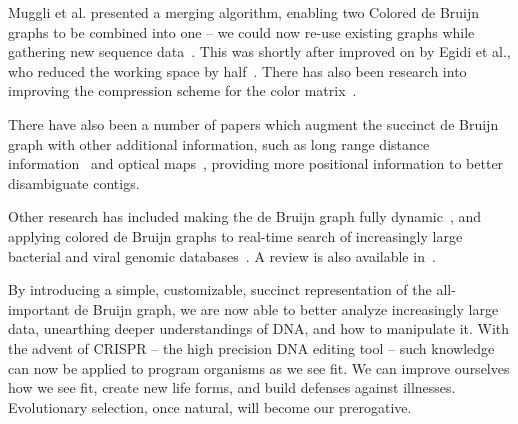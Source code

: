 Muggli et al. presented a merging algorithm, enabling two Colored de Bruijn graphs to be combined into one -- we could now re-use existing graphs while gathering new sequence data~\cite{Mug19}. This was shortly after improved on by Egidi et al., who reduced the working space by half~\cite{Egi19}. There has also been research into improving the compression scheme for the color matrix~\cite{Ali18,Mus18}.

There have also been a number of papers which augment the succinct de Bruijn graph with other additional information, such as long range distance information~\cite{Tur18} and optical maps~\cite{Muk18}, providing more positional information to better disambiguate contigs.

Other research has included making the de Bruijn graph fully dynamic~\cite{Cra18,Bel16}, and applying colored de Bruijn graphs to real-time search of increasingly large bacterial and viral genomic databases~\cite{Bra17}. A review is also available in~\cite{Mar19}.

By introducing a simple, customizable, succinct representation of the all-important de Bruijn graph, we are now able to better analyze increasingly large data, unearthing deeper understandings of DNA, and how to manipulate it. With the advent of CRISPR -- the high precision DNA editing tool -- such knowledge can now be applied to program organisms as we see fit. We can improve ourselves how we see fit, create new life forms, and build defenses against illnesses. Evolutionary selection, once natural, will become our prerogative.

